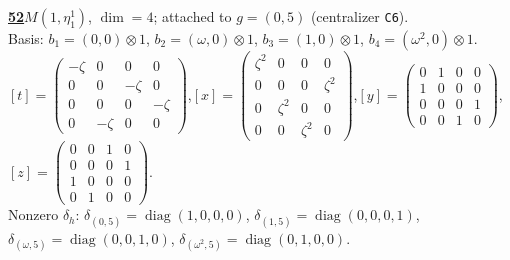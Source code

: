 \begin{samepage}\noindent\textbf{\underline{52}}\quad $M(1,\eta^{1}_{1})$, $\dim=4$; attached to $g=(0,5)$ (centralizer \texttt{C6}).\\
Basis: $b_{1}=(0,0)\otimes 1$, $b_{2}=(\omega,0)\otimes 1$, $b_{3}=(1,0)\otimes 1$, $b_{4}=(\omega^2,0)\otimes 1$.\\
$[t]=\left(\begin{smallmatrix} -\zeta & 0 & 0 & 0 \\ 0 & 0 & -\zeta & 0 \\ 0 & 0 & 0 & -\zeta \\ 0 & -\zeta & 0 & 0 \end{smallmatrix}\right)$,\quad $[x]=\left(\begin{smallmatrix} \zeta^2 & 0 & 0 & 0 \\ 0 & 0 & 0 & \zeta^2 \\ 0 & \zeta^2 & 0 & 0 \\ 0 & 0 & \zeta^2 & 0 \end{smallmatrix}\right)$,\quad $[y]=\left(\begin{smallmatrix} 0 & 1 & 0 & 0 \\ 1 & 0 & 0 & 0 \\ 0 & 0 & 0 & 1 \\ 0 & 0 & 1 & 0 \end{smallmatrix}\right)$,\quad $[z]=\left(\begin{smallmatrix} 0 & 0 & 1 & 0 \\ 0 & 0 & 0 & 1 \\ 1 & 0 & 0 & 0 \\ 0 & 1 & 0 & 0 \end{smallmatrix}\right)$.\\
Nonzero $\delta_h$: $\delta_{(0,5)}=\operatorname{diag}(1,0,0,0)$, $\delta_{(1,5)}=\operatorname{diag}(0,0,0,1)$, $\delta_{(\omega,5)}=\operatorname{diag}(0,0,1,0)$, $\delta_{(\omega^2,5)}=\operatorname{diag}(0,1,0,0)$.\end{samepage}
\medskip


